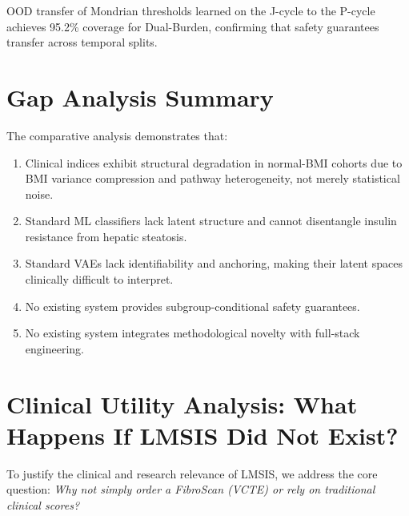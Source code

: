 \documentclass[12pt,a4paper,oneside]{report}
\begin{document}
OOD transfer of Mondrian thresholds learned on the J-cycle to the P-cycle achieves 95.2\% coverage for Dual-Burden, confirming that safety guarantees transfer across temporal splits.

\section{Gap Analysis Summary}

The comparative analysis demonstrates that:
\begin{enumerate}[leftmargin=*]
    \item Clinical indices exhibit structural degradation in normal-BMI cohorts due to BMI variance compression and pathway heterogeneity, not merely statistical noise.
    \item Standard ML classifiers lack latent structure and cannot disentangle insulin resistance from hepatic steatosis.
    \item Standard VAEs lack identifiability and anchoring, making their latent spaces clinically difficult to interpret.
    \item No existing system provides subgroup-conditional safety guarantees.
    \item No existing system integrates methodological novelty with full-stack engineering.
\end{enumerate}

\section{Clinical Utility Analysis: What Happens If LMSIS Did Not Exist?}

To justify the clinical and research relevance of LMSIS, we address the core question: \textit{Why not simply order a FibroScan (VCTE) or rely on traditional clinical scores?}

\begin{table}[H]
\centering
\caption{Clinical utility and cost comparison matrix.}
\label{tab:clinical_utility}
\end{table}
\end{document}
